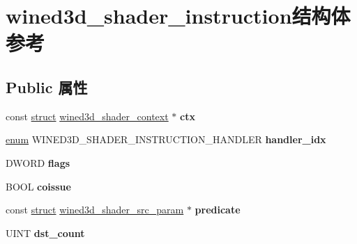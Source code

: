 \hypertarget{structwined3d__shader__instruction}{}\section{wined3d\+\_\+shader\+\_\+instruction结构体 参考}
\label{structwined3d__shader__instruction}
\subsection*{Public 属性}
\begin{DoxyCompactItemize}
\item 
\mbox{\label{structwined3d__shader__instruction_aae0ba26ecdbc4119523b951236f6d6b1}} 
const \hyperlink{interfacestruct}{struct} \hyperlink{structwined3d__shader__context}{wined3d\+\_\+shader\+\_\+context} $\ast$ {\bfseries ctx}
\item 
\mbox{\label{structwined3d__shader__instruction_a6d1b708679599ff3bfc1d1b3dbd2e730}} 
\hyperlink{interfaceenum}{enum} W\+I\+N\+E\+D3\+D\+\_\+\+S\+H\+A\+D\+E\+R\+\_\+\+I\+N\+S\+T\+R\+U\+C\+T\+I\+O\+N\+\_\+\+H\+A\+N\+D\+L\+ER {\bfseries handler\+\_\+idx}
\item 
\mbox{\label{structwined3d__shader__instruction_ab48902aec87280f5c8152f734db9d9b1}} 
D\+W\+O\+RD {\bfseries flags}
\item 
\mbox{\label{structwined3d__shader__instruction_a4c9344ce864f8ebd5ed1284b3ff9bdb1}} 
B\+O\+OL {\bfseries coissue}
\item 
\mbox{\label{structwined3d__shader__instruction_a6ab5edb5f0f95c19f117ae7d9def014f}} 
const \hyperlink{interfacestruct}{struct} \hyperlink{structwined3d__shader__src__param}{wined3d\+\_\+shader\+\_\+src\+\_\+param} $\ast$ {\bfseries predicate}
\item 
\mbox{\label{structwined3d__shader__instruction_acdfc7fd559c876f1556bf8e44aa1aec9}} 
U\+I\+NT {\bfseries dst\+\_\+count}
\item 
\mbox{\label{structwined3d__shader__instruction_a4adf56f97da9927bdda30f928671b008}} 

\end{DoxyCompactItemize}
